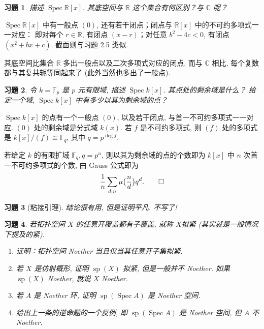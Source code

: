 \documentclass{article}
\theoremstyle{exercise}
\newtheorem{exercise}{习题}[section]
\newenvironment{proofc}{\proof}{\endproof}
\def\F{\mathbb{F}}
\def\R{\mathbb{R}}
\def\C{\mathbb{C}}
\def\spp{\operatorname{sp}}
\def\Spec{\operatorname{Spec}}
\begin{document}
\begin{exercise}
  描述 $\Spec \R[x]$. 其底空间与 $\R$ 这个集合有何区别？与 $\C$ 呢？
\end{exercise}

\begin{proofc}
  $\Spec \R[x]$ 中有一般点 $(0)$, 还有若干闭点；闭点与 $\R[x]$ 中的不可约多项式一一对应：
  即对每个 $r \in \R$, 有闭点 $(x - r)$；对任意 $b^2 - 4c < 0$, 有闭点 $(x^2 + bx + c)$.
  截面则与习题 2.5 类似.

  其底空间比集合 $\R$ 多出一般点以及二次多项式对应的闭点.
  而与 $\C$ 相比, 每个复数都与其复共轭等同起来了 (此外当然也多出了一般点).
\end{proofc}

\begin{exercise}
  令 $k = \F_p$ 是 $p$ 元有限域, 描述 $\Spec k[x]$. 其点处的剩余域是什么？
  给定一个域, $\Spec k[x]$ 中有多少以其为剩余域的点？
\end{exercise}

\begin{proofc}
  $\Spec k[x]$ 的点有一个一般点 $(0)$, 以及若干闭点, 与首一不可约多项式一一对应.
  $(0)$ 处的剩余域是分式域 $k(x)$.
  若 $f$ 是不可约多项式, 则 $(f)$ 处的多项式是 $k[x] / (f) \cong \F_q$,
  其中 $q = p^{\deg f}$.

  若给定 $k$ 的有限扩域 $\F_q, q = p^n$,
  则以其为剩余域的点的个数即为 $k[x]$ 中 $n$ 次首一不可约多项式的个数,
  由 Gauss 公式即为
  \[
    \frac{1}{n} \sum_{d \mid n} \mu\bigl(\frac{n}{d}\bigr) q^d. \qedhere
  \]
\end{proofc}

\begin{exercise}[粘接引理]
  结论很有用, 但是证明平凡. 不写了! %
\end{exercise}

\begin{exercise}
  若拓扑空间 $X$ 的任意开覆盖都有子覆盖, 就称 $X$\emph{拟紧} (其实就是一般情况下提及的紧).
  \begin{enumerate}[label={(\alph*)}]
    \item 证明：拓扑空间 Noether 当且仅当其任意开子集拟紧.
    \item 若 $X$ 是仿射概形, 证明 $\spp(X)$ 拟紧, 但是一般并不 Noether.
          如果 $\spp(X)$ Noether, 就说 $X$ Noether.
    \item 若 $A$ 是 Noether 环, 证明 $\spp(\Spec A)$ 是 Noether 空间.
    \item 给出上一条的逆命题的一个反例, 即 $\spp(\Spec A)$ 是 Noether 空间, 但 $A$ 不 Noether.
  \end{enumerate}
\end{exercise}
\end{document}
